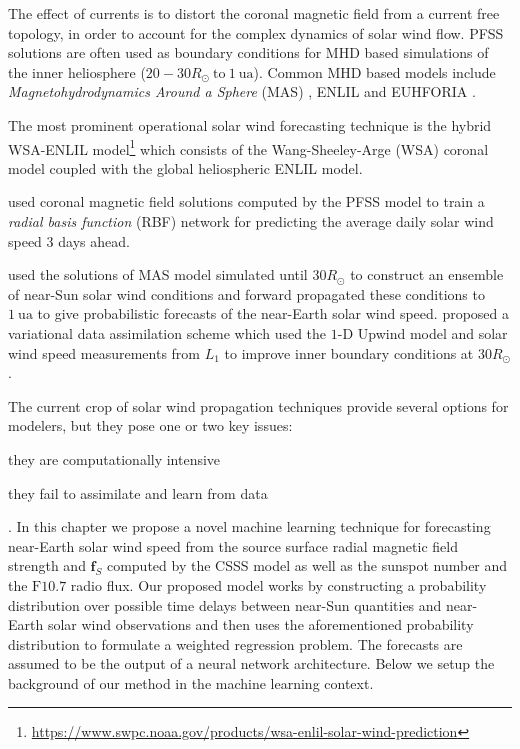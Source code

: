 The effect of currents is to distort the coronal magnetic field from a current free topology, 
in order to account for the complex dynamics of solar wind flow. PFSS solutions are often used as 
boundary conditions for MHD based simulations of the inner heliosphere 
($20-30 R_{\odot} \ \mathrm{to} \ \SI{1}{\astronomicalunit}$). Common MHD based models include 
\emph{Magnetohydrodynamics Around a Sphere} (MAS) \citep{linker1999magnetohydrodynamic}, ENLIL 
\citep{ODSTRCIL1996,ODSTRCIL1999a,ODSTRCIL1999b,ODSTRCIL2003,ODSTRCIL2004} and EUHFORIA 
\citep{pomoell2018euhforia}. 

The most prominent operational solar wind forecasting technique is the hybrid WSA-ENLIL 
model\footnote{\url{https://www.swpc.noaa.gov/products/wsa-enlil-solar-wind-prediction}} which 
consists of the Wang-Sheeley-Arge (WSA) coronal model coupled with the global heliospheric ENLIL 
model. 

\citet{wintoft1997prediction} used coronal magnetic field solutions computed by the PFSS model 
to train a \emph{radial basis function} (RBF) network for predicting the average daily solar wind 
speed $3$ days ahead.  

\citet{Owens2017} used the solutions of MAS model simulated until $30R_{\odot}$ to construct an 
ensemble of near-Sun solar wind conditions and forward propagated these conditions to 
$\SI{1}{\astronomicalunit}$ to give probabilistic forecasts of the near-Earth solar wind speed. 
\citet{Owens2019} proposed a variational data assimilation scheme which used the 
$1\textrm{-}\text{D}$ Upwind model and solar wind speed measurements from $L_1$ to improve inner 
boundary conditions at $30R_{\odot}$.

The current crop of solar wind propagation techniques provide several options for 
modelers, but they pose one or two key issues: 
%
\begin{enumerate*} 
  \item they are computationally intensive 
  \item they fail to assimilate and learn from data 
\end{enumerate*}. 
%
In this chapter we propose a novel machine learning technique for forecasting near-Earth solar wind 
speed from the source surface radial magnetic field strength and $\mathbf{f}_S$ computed by the 
CSSS model as well as the sunspot number and the $\mathrm{F}10.7$ radio flux. Our proposed model 
works by constructing a probability distribution over possible time delays between near-Sun 
quantities and near-Earth solar wind observations and then uses the aforementioned probability 
distribution to formulate a weighted regression problem. The forecasts are assumed to be the output 
of a neural network architecture. Below we setup the background of our method in the machine 
learning context.

